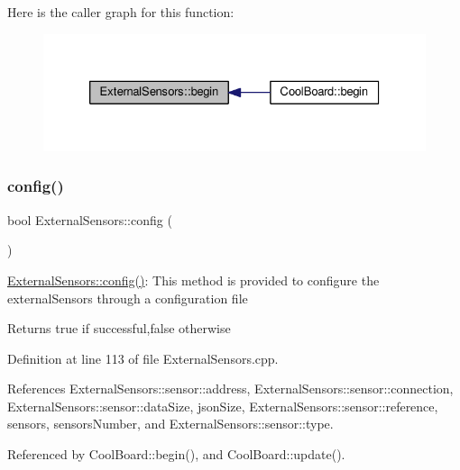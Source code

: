 Here is the caller graph for this function\+:
\nopagebreak
\begin{figure}[H]
\begin{center}
\leavevmode
\includegraphics[width=326pt]{classExternalSensors_a58ede0d786a86417254708870f04a21e_icgraph}
\end{center}
\end{figure}
\mbox{\label{classExternalSensors_a862a4bd11346b37270d0244c2adabe5a}} 
\subsubsection{\texorpdfstring{config()}{config()}}
{\footnotesize\ttfamily bool External\+Sensors\+::config (\begin{DoxyParamCaption}{ }\end{DoxyParamCaption})}

\hyperlink{classExternalSensors_a862a4bd11346b37270d0244c2adabe5a}{External\+Sensors\+::config()}\+: This method is provided to configure the external\+Sensors through a configuration file

\begin{DoxyReturn}{Returns}
true if successful,false otherwise 
\end{DoxyReturn}


Definition at line 113 of file External\+Sensors.\+cpp.



References External\+Sensors\+::sensor\+::address, External\+Sensors\+::sensor\+::connection, External\+Sensors\+::sensor\+::data\+Size, json\+Size, External\+Sensors\+::sensor\+::reference, sensors, sensors\+Number, and External\+Sensors\+::sensor\+::type.



Referenced by Cool\+Board\+::begin(), and Cool\+Board\+::update().



